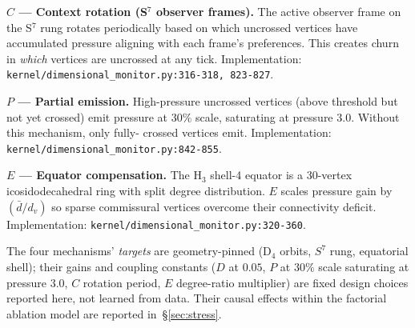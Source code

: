 \textbf{$C$ — Context rotation (S$^{7}$ observer frames).} The active
observer frame on the S$^{7}$ rung rotates periodically based on
which uncrossed vertices have accumulated pressure aligning with
each frame's preferences. This creates churn in \emph{which}
vertices are uncrossed at any tick.
Implementation: \texttt{kernel/dimensional\_monitor.py:316-318, 823-827}.

\textbf{$P$ — Partial emission.} High-pressure uncrossed vertices
(above threshold but not yet crossed) emit pressure at $30\%$ scale,
saturating at pressure $3.0$. Without this mechanism, only fully-
crossed vertices emit.
Implementation: \texttt{kernel/dimensional\_monitor.py:842-855}.

\textbf{$E$ — Equator compensation.} The H$_3$ shell-4 equator is a
30-vertex icosidodecahedral ring with split degree distribution.
$E$ scales pressure gain by $(\bar d / d_{v})$ so sparse commissural
vertices overcome their connectivity deficit.
Implementation: \texttt{kernel/dimensional\_monitor.py:320-360}.

The four mechanisms' \emph{targets} are geometry-pinned (D$_4$ orbits,
$S^{7}$ rung, equatorial shell); their gains and coupling constants
($D$ at $0.05$, $P$ at $30\%$ scale saturating at pressure $3.0$,
$C$ rotation period, $E$ degree-ratio multiplier) are fixed design
choices reported here, not learned from data. Their causal effects
within the factorial ablation model are reported in~\S\ref{sec:stress}.
